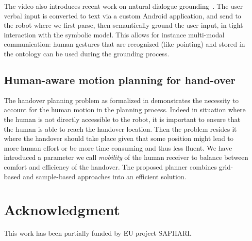 \documentclass[conference]{IEEEtran}
\begin{document}
The video also introduces recent work on natural dialogue
grounding~\cite{Lemaignan2011a}. The user verbal input is converted to text via
a custom Android application, and send to the robot where we first parse, then
semantically ground the user input, in tight interaction with the symbolic
model. This allows for instance multi-modal communication: human gestures that
are recognized (like pointing) and stored in the ontology can be used during
the grounding process.

\subsection{Human-aware motion planning for hand-over}

The handover planning problem as formalized in \cite{Mainprice:12} demonstrates the necessity to account for the human motion in the planning process. Indeed in situation where the human is not directly accessible to the robot, it is important to ensure that the human is able to reach the handover location. Then the problem resides it where the handover should take place given that some position might lead to more human effort or be more time consuming and thus less fluent. We have introduced a parameter we call \textit{mobility} of the human receiver to balance between comfort and efficiency of the handover. The proposed planner combines grid-based and sample-based approaches into an efficient solution.

\section*{Acknowledgment}

This work has been partially funded by EU project SAPHARI.




\end{document}
